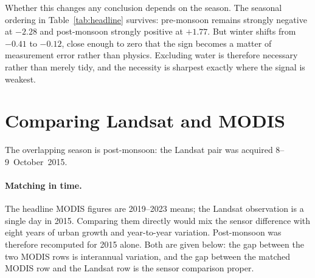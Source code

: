 \documentclass[11pt,a4paper]{article}
\begin{document}
Whether this changes any conclusion depends on the season. The
seasonal ordering in Table~\ref{tab:headline} survives: pre-monsoon
remains strongly negative at $-2.28$ and post-monsoon strongly
positive at $+1.77$. But winter shifts from $-0.41$ to $-0.12$, close
enough to zero that the sign becomes a matter of measurement error
rather than physics. Excluding water is therefore necessary rather
than merely tidy, and the necessity is sharpest exactly where the
signal is weakest.

\section{Comparing Landsat and MODIS}
\label{sec:comparison}

The overlapping season is post-monsoon: the Landsat pair was acquired
8--9~October~2015.

\paragraph{Matching in time.}
The headline MODIS figures are 2019--2023 means; the Landsat
observation is a single day in 2015. Comparing them directly would mix
the sensor difference with eight years of urban growth and
year-to-year variation. Post-monsoon was therefore recomputed for 2015
alone. Both are given below: the gap between the two MODIS rows is
interannual variation, and the gap between the matched MODIS row and
the Landsat row is the sensor comparison proper.
\end{document}
